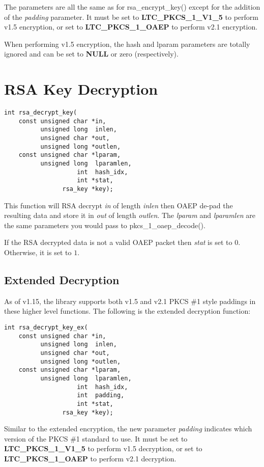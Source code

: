 \documentclass[synpaper]{book}
\newcommand{\mysection}[1]    %
	{                   %
	\section{#1}
   \markboth{\textsf{www.libtom.net}}{\thesection ~ {#1}}
	}
\begin{document}
 
The parameters are all the same as for rsa\_encrypt\_key() except for the addition of the \textit{padding} parameter.  It must be set to
\textbf{LTC\_PKCS\_1\_V1\_5} to perform v1.5 encryption, or set to \textbf{LTC\_PKCS\_1\_OAEP} to perform v2.1 encryption.

When performing v1.5 encryption, the hash and lparam parameters are totally ignored and can be set to \textbf{NULL} or zero (respectively).

\mysection{RSA Key Decryption}
\begin{verbatim}
int rsa_decrypt_key(
    const unsigned char *in,
          unsigned long  inlen,
          unsigned char *out,
          unsigned long *outlen,
    const unsigned char *lparam,
          unsigned long  lparamlen,
                    int  hash_idx,
                    int *stat,
                rsa_key *key);
\end{verbatim}
This function will RSA decrypt \textit{in} of length \textit{inlen} then OAEP de-pad the resulting data and store it in
\textit{out} of length \textit{outlen}.  The \textit{lparam} and \textit{lparamlen} are the same parameters you would pass
to pkcs\_1\_oaep\_decode().

If the RSA decrypted data is not a valid OAEP packet then \textit{stat} is set to $0$.  Otherwise, it is set to $1$.

\subsection{Extended Decryption}
As of v1.15, the library supports both v1.5 and v2.1 PKCS \#1 style paddings in these higher level functions.  The following is the extended
decryption function:

\begin{verbatim}
int rsa_decrypt_key_ex(
    const unsigned char *in,
          unsigned long  inlen,
          unsigned char *out,
          unsigned long *outlen,
    const unsigned char *lparam,
          unsigned long  lparamlen,
                    int  hash_idx,
                    int  padding,
                    int *stat,
                rsa_key *key);
\end{verbatim}

Similar to the extended encryption, the new parameter \textit{padding} indicates which version of the PKCS \#1 standard to use.
It must be set to \textbf{LTC\_PKCS\_1\_V1\_5} to perform v1.5 decryption, or set to \textbf{LTC\_PKCS\_1\_OAEP} to perform v2.1 decryption.
\end{document}

